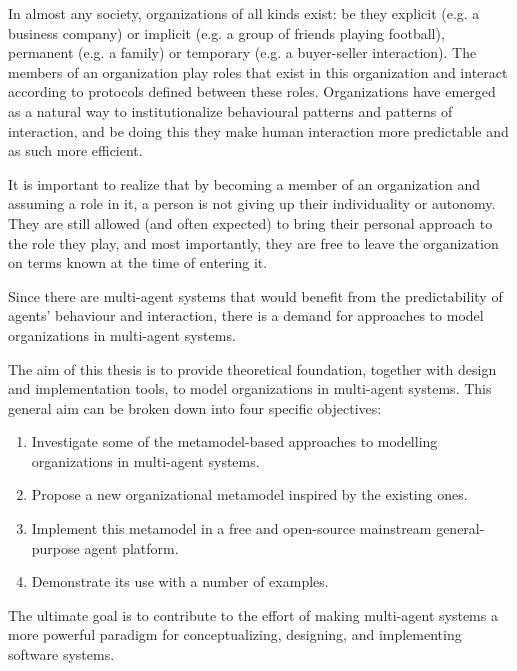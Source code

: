 In almost any society, organizations of all kinds exist: be they explicit (e.g. a business company) or implicit (e.g. a group of friends playing football), permanent (e.g. a family) or temporary (e.g. a buyer-seller interaction).
The members of an organization play roles that exist in this organization and interact according to protocols defined between these roles.
Organizations have emerged as a natural way to institutionalize behavioural patterns and patterns of interaction, and be doing this they make human interaction more predictable and as such more efficient.

It is important to realize that by becoming a member of an organization and assuming a role in it, a person is not giving up their individuality or autonomy.
They are still allowed (and often expected) to bring their personal approach to the role they play, and most importantly, they are free to leave the organization on terms known at the time of entering it.

Since there are multi-agent systems that would benefit from the predictability of agents' behaviour and interaction, there is a demand for approaches to model organizations in multi-agent systems.


The aim of this thesis is to provide theoretical foundation, together with design and implementation tools, to model organizations in multi-agent systems.
This general aim can be broken down into four specific objectives:
\begin{enumerate}
	\item Investigate some of the metamodel-based approaches to modelling organizations in multi-agent systems.
	\item Propose a new organizational metamodel inspired by the existing ones.
	\item Implement this metamodel in a free and open-source mainstream general-purpose agent platform.
	\item Demonstrate its use with a number of examples. 
\end{enumerate}
The ultimate goal is to contribute to the effort of making multi-agent systems a more powerful paradigm for conceptualizing, designing, and implementing software systems.


